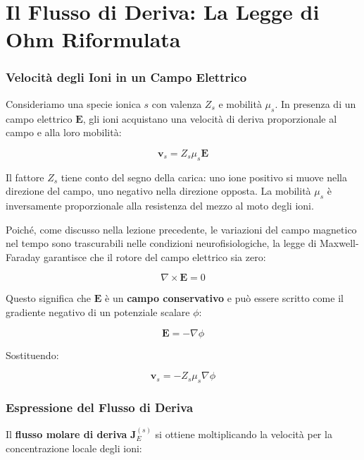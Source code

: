 \section{Il Flusso di Deriva: La Legge di Ohm Riformulata}

\subsubsection{Velocità degli Ioni in un Campo Elettrico}

Consideriamo una specie ionica $s$ con valenza $Z_s$ e mobilità $\mu_s$. In presenza di un campo elettrico $\mathbf{E}$, gli ioni acquistano una velocità di deriva proporzionale al campo e alla loro mobilità:

\begin{equation}
\mathbf{v}_s = Z_s \mu_s \mathbf{E}
\end{equation}

Il fattore $Z_s$ tiene conto del segno della carica: uno ione positivo si muove nella direzione del campo, uno negativo nella direzione opposta. La mobilità $\mu_s$ è inversamente proporzionale alla resistenza del mezzo al moto degli ioni.

Poiché, come discusso nella lezione precedente, le variazioni del campo magnetico nel tempo sono trascurabili nelle condizioni neurofisiologiche, la legge di Maxwell-Faraday garantisce che il rotore del campo elettrico sia zero:

\begin{equation}
\nabla \times \mathbf{E} = 0
\end{equation}

Questo significa che $\mathbf{E}$ è un \textbf{campo conservativo} e può essere scritto come il gradiente negativo di un potenziale scalare $\phi$:

\begin{equation}
\mathbf{E} = -\nabla\phi
\end{equation}

Sostituendo:

\begin{equation}
\mathbf{v}_s = -Z_s \mu_s \nabla\phi
\end{equation}

\subsubsection{Espressione del Flusso di Deriva}

Il \textbf{flusso molare di deriva} $\mathbf{J}_E^{(s)}$ si ottiene moltiplicando la velocità per la concentrazione locale degli ioni:

